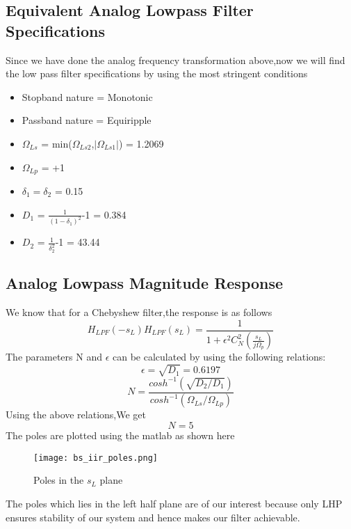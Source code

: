 \documentclass[12pt]{article}
\begin{document}
\subsection{\textbf{Equivalent Analog Lowpass Filter Specifications}}
Since we have done the analog frequency transformation above,now we will find the low pass filter specifications by using the most stringent conditions \\
\begin{itemize}
    \item Stopband nature = Monotonic
    \item Passband nature = Equiripple
    \item $\Omega_{Ls}$ = min($\Omega_{Ls2}$,$\left|\Omega_{Ls1}\right|$) = 1.2069
    \item $\Omega_{Lp}$ = +1
    \item $\delta_1 = \delta_2$ = 0.15
    \item $D_1$ = $\frac{1}{(1-\delta_1)^2}$-1 = 0.384
    \item $D_2$ = $\frac{1}{\delta_2^2}$-1 = 43.44
\end{itemize}
\subsection{\textbf{Analog Lowpass Magnitude Response}}
We know that for a Chebyshew filter,the response is as follows
\begin{equation*}
    H_{LPF}(-s_L) H_{LPF}(s_L) = \frac{1}{1+\epsilon ^2C_N^{2}(\frac{s_L}{j\Omega_p})}
\end{equation*}
The parameters N and $\epsilon$ can be calculated by using the following relations:
\begin{equation*}
    \epsilon = \sqrt{D_1} = 0.6197
\end{equation*}
\begin{equation*}
    N = \frac{cosh^{-1}(\sqrt{D_2/D_1})}{cosh^{-1}(\Omega_{Ls}/\Omega_{Lp})} 
\end{equation*}
Using the above relations,We get\\
\begin{equation*}
    N = 5
\end{equation*}
The poles are plotted using the matlab as shown here
\begin{figure}[H]
\centering
\texttt{[image: bs\_iir\_poles.png]}
\caption{Poles in the $s_L$ plane}
\label{fig:mesh2}
\end{figure}
The poles which lies in the left half plane are of our interest because only LHP ensures stability of our system and hence makes our filter achievable.
\end{document}
